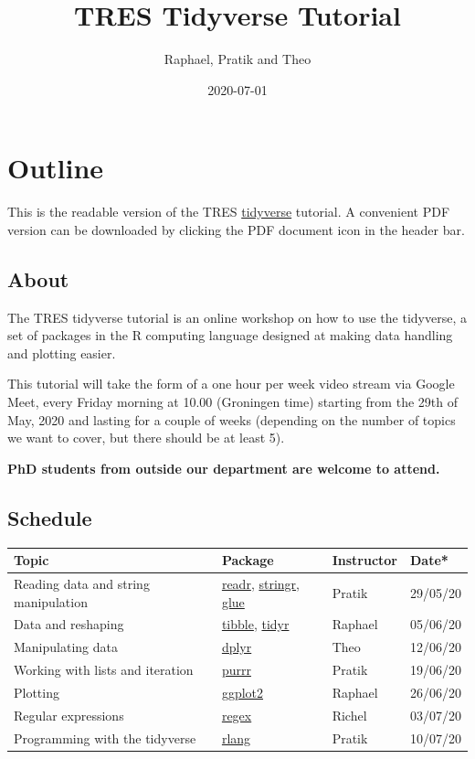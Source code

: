 \documentclass[]{book}
\title{TRES Tidyverse Tutorial}
\author{Raphael, Pratik and Theo}
\date{2020-07-01}
\begin{document}
\maketitle


\linenumbers

{
\setcounter{tocdepth}{1}
\tableofcontents
}
\hypertarget{outline}{%
\chapter*{Outline}\label{outline}}

This is the readable version of the TRES \href{https://www.tidyverse.org/}{tidyverse} tutorial. A convenient PDF version can be downloaded by clicking the PDF document icon in the header bar.

\hypertarget{about}{%
\section*{About}\label{about}}

The TRES tidyverse tutorial is an online workshop on how to use the tidyverse, a set of packages in the R computing language designed at making data handling and plotting easier.

This tutorial will take the form of a one hour per week video stream via Google Meet, every Friday morning at 10.00 (Groningen time) starting from the 29th of May, 2020 and lasting for a couple of weeks (depending on the number of topics we want to cover, but there should be at least 5).

\textbf{PhD students from outside our department are welcome to attend.}

\hypertarget{schedule}{%
\section*{Schedule}\label{schedule}}

\begin{longtable}[]{@{}llll@{}}
\toprule
Topic & Package & Instructor & Date*\tabularnewline
\midrule
\endhead
Reading data and string manipulation & \href{https://readr.tidyverse.org/}{readr}, \href{https://stringr.tidyverse.org/}{stringr}, \href{https://github.com/tidyverse/glue}{glue} & Pratik & 29/05/20\tabularnewline
Data and reshaping & \href{https://tibble.tidyverse.org/}{tibble}, \href{https://tidyr.tidyverse.org/}{tidyr} & Raphael & 05/06/20\tabularnewline
Manipulating data & \href{https://dplyr.tidyverse.org/}{dplyr} & Theo & 12/06/20\tabularnewline
Working with lists and iteration & \href{https://purrr.tidyverse.org/}{purrr} & Pratik & 19/06/20\tabularnewline
Plotting & \href{https://ggplot2.tidyverse.org/}{ggplot2} & Raphael & 26/06/20\tabularnewline
Regular expressions & \href{https://stat.ethz.ch/R-manual/R-devel/library/base/html/regex.html}{regex} & Richel & 03/07/20\tabularnewline
Programming with the tidyverse & \href{https://rlang.r-lib.org/}{rlang} & Pratik & 10/07/20\tabularnewline
\bottomrule
\end{longtable}
\end{document}
